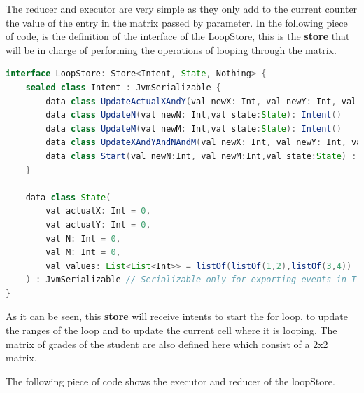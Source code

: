 The reducer and executor are very simple as they only add to the current counter the value of the entry in the matrix passed by parameter. 
In the following piece of code, is the definition of the interface of the LoopStore, this is the \textbf{store} that will be in charge of performing the operations of looping through the matrix.

\begin{lstlisting}[language=java]
interface LoopStore: Store<Intent, State, Nothing> {
    sealed class Intent : JvmSerializable {
        data class UpdateActualXAndY(val newX: Int, val newY: Int, val state:State) : Intent()
        data class UpdateN(val newN: Int,val state:State): Intent()
        data class UpdateM(val newM: Int,val state:State): Intent()
        data class UpdateXAndYAndNAndM(val newX: Int, val newY: Int, val newN: Int, val newM: Int): Intent()
        data class Start(val newN:Int, val newM:Int,val state:State) : Intent()
    }

    data class State(
        val actualX: Int = 0,
        val actualY: Int = 0,
        val N: Int = 0,
        val M: Int = 0,
        val values: List<List<Int>> = listOf(listOf(1,2),listOf(3,4))
    ) : JvmSerializable // Serializable only for exporting events in Time Travel, no need otherwise.
}
\end{lstlisting}

As it can be seen, this \textbf{store} will receive intents to start the for loop, to update the ranges of the loop and to update the current cell where it is looping. The matrix of grades of the student are also defined here which consist of a 2x2 matrix.

The following piece of code shows the executor and reducer of the loopStore.

